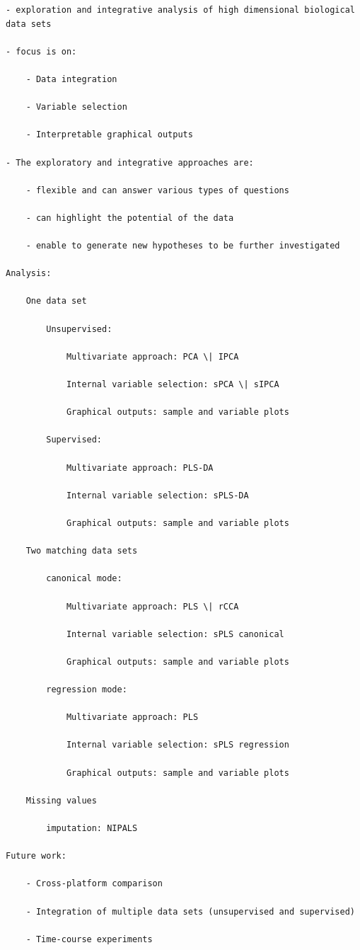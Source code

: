 \documentclass[
]{book}
\begin{document}
\begin{verbatim}
- exploration and integrative analysis of high dimensional biological data sets

- focus is on:

    - Data integration

    - Variable selection

    - Interpretable graphical outputs

- The exploratory and integrative approaches are:

    - flexible and can answer various types of questions

    - can highlight the potential of the data

    - enable to generate new hypotheses to be further investigated

Analysis:

    One data set

        Unsupervised:

            Multivariate approach: PCA \| IPCA

            Internal variable selection: sPCA \| sIPCA

            Graphical outputs: sample and variable plots

        Supervised:

            Multivariate approach: PLS-DA

            Internal variable selection: sPLS-DA

            Graphical outputs: sample and variable plots

    Two matching data sets

        canonical mode:

            Multivariate approach: PLS \| rCCA

            Internal variable selection: sPLS canonical

            Graphical outputs: sample and variable plots

        regression mode:

            Multivariate approach: PLS

            Internal variable selection: sPLS regression

            Graphical outputs: sample and variable plots

    Missing values

        imputation: NIPALS

Future work:

    - Cross-platform comparison

    - Integration of multiple data sets (unsupervised and supervised)

    - Time-course experiments
\end{verbatim}
\end{document}
